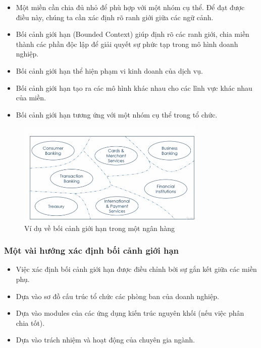 \begin{itemize}

\item Một miền cần chia đủ nhỏ để phù hợp với một nhóm cụ thể. Để đạt được điều này, chúng ta cần xác định rõ ranh giới giữa các ngữ cảnh.

\item Bối cảnh giới hạn (Bounded Context) giúp định rõ các ranh giới, chia miền thành các phần độc lập để giải quyết sự phức tạp trong mô hình doanh nghiệp.

\item Bối cảnh giới hạn thể hiện phạm vi kinh doanh của dịch vụ.

\item Bối cảnh giới hạn tạo ra các mô hình khác nhau cho các lĩnh vực khác nhau của miền.

\item Bối cảnh giới hạn tương ứng với một nhóm cụ thể trong tổ chức.

\end{itemize}

\begin{figure}[H]

\centering

\includegraphics[width = 0.8\textwidth]{pictures/BoiCanhGioiHan/main.png}

\caption{Ví dụ về bối cảnh giới hạn trong một ngân hàng}

\end{figure}

\subsubsection{Một vài hướng xác định bối cảnh giới hạn}

\begin{itemize}

\item Việc xác định bối cảnh giới hạn được điều chỉnh bởi sự gắn kết giữa các miền phụ.

\item Dựa vào sơ đồ cấu trúc tổ chức các phòng ban của doanh nghiệp.

\item Dựa vào modules của các ứng dụng kiến trúc nguyên khối (nếu việc phân chia tốt).

\item Dựa vào trách nhiệm và hoạt động của chuyên gia ngành.

\end{itemize}



